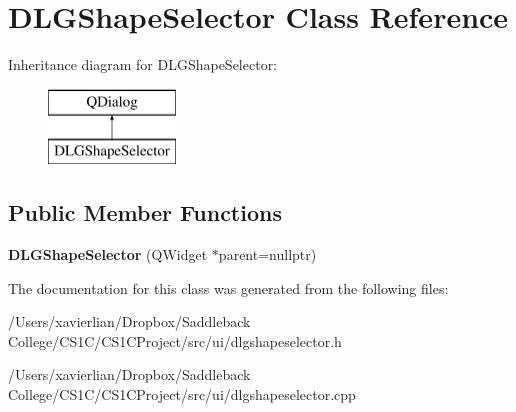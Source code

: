 \hypertarget{class_d_l_g_shape_selector}{}\section{D\+L\+G\+Shape\+Selector Class Reference}
\label{class_d_l_g_shape_selector}
Inheritance diagram for D\+L\+G\+Shape\+Selector\+:\begin{figure}[H]
\begin{center}
\leavevmode
\includegraphics[height=2.000000cm]{class_d_l_g_shape_selector}
\end{center}
\end{figure}
\subsection*{Public Member Functions}
\begin{DoxyCompactItemize}
\item 
\mbox{\label{class_d_l_g_shape_selector_a70c7ab9ba3c2cff579eb2886383dcdab}} 
{\bfseries D\+L\+G\+Shape\+Selector} (Q\+Widget $\ast$parent=nullptr)
\end{DoxyCompactItemize}


The documentation for this class was generated from the following files\+:\begin{DoxyCompactItemize}
\item 
/\+Users/xavierlian/\+Dropbox/\+Saddleback College/\+C\+S1\+C/\+C\+S1\+C\+Project/src/ui/dlgshapeselector.\+h\item 
/\+Users/xavierlian/\+Dropbox/\+Saddleback College/\+C\+S1\+C/\+C\+S1\+C\+Project/src/ui/dlgshapeselector.\+cpp\end{DoxyCompactItemize}
